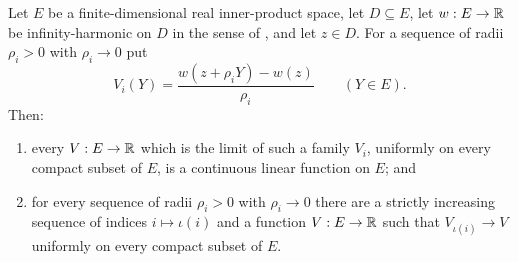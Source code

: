 \begin{theorem}
Let $E$ be a finite-dimensional real inner-product space, let $D\subseteq E$,
let $w:E\to\mathbb{R}$ be infinity-harmonic on $D$ in the sense of
, and let $z\in D$. For a sequence of radii
$\rho_i>0$ with $\rho_i\to0$ put
\[
  V_i(Y)=\frac{w(z+\rho_iY)-w(z)}{\rho_i}\qquad(Y\in E).
\]
Then:
\begin{enumerate}
\item every $V:E\to\mathbb{R}$ which is the limit of such a family $V_i$, uniformly on
every compact subset of $E$, is a continuous linear function on $E$; and
\item for every sequence of radii $\rho_i>0$ with $\rho_i\to0$ there are a
strictly increasing sequence of indices $i\mapsto\iota(i)$ and a function
$V:E\to\mathbb{R}$ such that $V_{\iota(i)}\to V$ uniformly on every compact subset of
$E$.
\end{enumerate}
\end{theorem}
